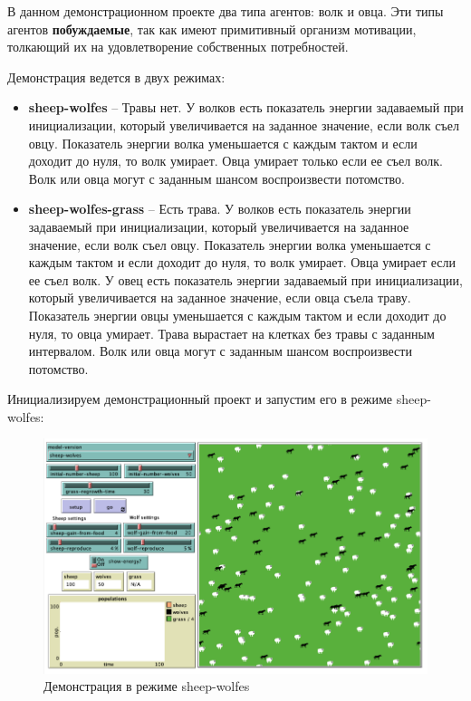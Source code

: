 \documentclass[14pt,a4paper,report]{report}
\begin{document}
В данном демонстрационном проекте два типа агентов: волк и овца. Эти типы агентов \textbf{побуждаемые}, так как имеют примитивный организм мотивации, толкающий их на удовлетворение собственных потребностей.

Демонстрация ведется в двух режимах:

\begin{itemize}
	\item \textbf{sheep-wolfes} -- Травы нет. У волков есть показатель энергии задаваемый при инициализации, который увеличивается на заданное значение, если волк съел овцу. Показатель энергии волка уменьшается с каждым тактом и если доходит до нуля, то волк умирает. Овца умирает только если ее съел волк. Волк или овца могут с заданным шансом воспроизвести потомство.
	\item \textbf{sheep-wolfes-grass} -- Есть трава. У волков есть показатель энергии задаваемый при инициализации, который увеличивается на заданное значение, если волк съел овцу. Показатель энергии волка уменьшается с каждым тактом и если доходит до нуля, то волк умирает. Овца умирает если ее съел волк. У овец есть показатель энергии задаваемый при инициализации, который увеличивается на заданное значение, если овца съела траву. Показатель энергии овцы уменьшается с каждым тактом и если доходит до нуля, то овца умирает. Трава вырастает на клетках без травы с заданным интервалом. Волк или овца могут с заданным шансом воспроизвести потомство.
\end{itemize}

Инициализируем демонстрационный проект и запустим его в режиме sheep-wolfes:

\begin{figure}[h!]
	\centering
	\includegraphics[scale = 0.68]{images/4.png}
	\caption{Демонстрация в режиме sheep-wolfes}
\end{figure}
\end{document}
